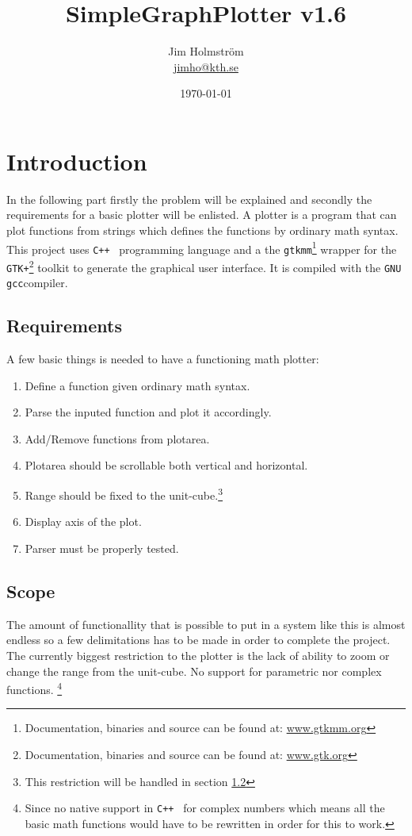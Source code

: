 \documentclass[a4paper,11pt]{kth-mag}
\title{SimpleGraphPlotter v1.6}
\subtitle{}
\author{Jim Holmstr\"{o}m\\\href{mailto:jimho@kth.se}{jimho@kth.se}}
\date{\today}
\newcommand{\Cpp}{\texttt{C++}}
\newcommand{\Gcc}{\texttt{gcc}}
\newcommand{\Gtkmm}{\texttt{gtkmm}}
\newcommand{\Gtk}{\texttt{GTK+}}
\begin{document}
\frontmatter
\pagestyle{empty}
\removepagenumbers
\maketitle
{}
\tableofcontents*
\mainmatter
\pagestyle{newchap}

\chapter{Introduction}
In the following part firstly the problem will be explained and secondly the requirements for a basic plotter will be enlisted.
A plotter is a program that can plot functions from strings which defines the functions by ordinary math syntax. 
This project uses \Cpp~ programming language and a the 
\Gtkmm\footnote{Documentation, binaries and source can be found at: \href{http://www.gtkmm.org}{www.gtkmm.org}} wrapper for the 
\Gtk\footnote{Documentation, binaries and source can be found at: \href{http://www.gtk.org}{www.gtk.org}} toolkit to generate the graphical user interface. 
It is compiled with the \texttt{GNU} \Gcc compiler.

\section{Requirements}
A few basic things is needed to have a functioning math plotter:
\begin{enumerate}
    \item Define a function given ordinary math syntax.
    \item Parse the inputed function and plot it accordingly.
    \item Add/Remove functions from plotarea.
    \item Plotarea should be scrollable both vertical and horizontal.
    \item Range should be fixed to the unit-cube.\footnote{This restriction will be handled in section \ref{sec:scope}}
    \item Display axis of the plot.
    \item Parser must be properly tested.
\end{enumerate}

\section{Scope}
\label{sec:scope}
The amount of functionallity that is possible to put in a system like this is almost endless so a few delimitations has to be made in order to complete the project.
The currently biggest restriction to the plotter is the lack of ability to zoom or change the range from the unit-cube.
No support for parametric nor complex functions.
\footnote{Since no native support in \Cpp~ for complex numbers which means all the basic math functions would have to be rewritten in order for this to work.}
\end{document}
